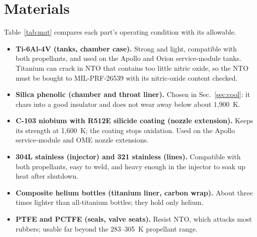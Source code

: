 \documentclass[10pt]{article}
\begin{document}
\section{Materials}
Table~\ref{tab:mat} compares each part's operating condition with its allowable.
\begin{itemize}
\item \textbf{Ti-6Al-4V (tanks, chamber case).} Strong and light, compatible with both propellants, and used on the
Apollo and Orion service-module tanks. Titanium can crack in NTO that contains too little nitric oxide, so the NTO must
be bought to MIL-PRF-26539 with its nitric-oxide content checked.
\item \textbf{Silica phenolic (chamber and throat liner).} Chosen in Sec.~\ref{sec:cool}: it chars into a good
insulator and does not wear away below about 1,900~K.
\item \textbf{C-103 niobium with R512E silicide coating (nozzle extension).} Keeps its strength at 1,600~K; the coating
stops oxidation. Used on the Apollo service-module and OME nozzle extensions.
\item \textbf{304L stainless (injector) and 321 stainless (lines).} Compatible with both propellants, easy to weld, and
heavy enough in the injector to soak up heat after shutdown.
\item \textbf{Composite helium bottles (titanium liner, carbon wrap).} About three times lighter than all-titanium
bottles; they hold only helium.
\item \textbf{PTFE and PCTFE (seals, valve seats).} Resist NTO, which attacks most rubbers; usable far beyond the
283--305~K propellant range.
\end{itemize}
\end{document}
